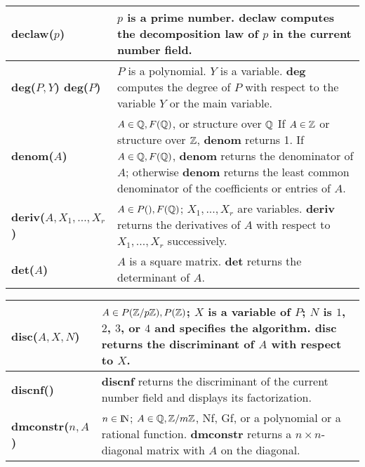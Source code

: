 {\begin{tabular}{|p{1.95in}|p{3.83in}|}
{\bf declaw($p$)} &
$p$ is a prime number.\newline
{\bf declaw} computes the decomposition law of $p$ in the current
number field.\\ \hline

{\bf deg($P, Y$)\newline
deg($P$)} &
$P$ is a polynomial. $Y$ is a variable.\newline
{\bf deg} computes the degree of $P$ with respect to the variable $Y$
or the main variable.\\ \hline

{\bf denom($A$)} &
$A \in \mbox{$\mathbb Q$}, F(\mbox{$\mathbb Q$})$, or structure over $\mbox{$\mathbb Q$}$\newline
If $A \in \mbox{$\mathbb Z$}$ or structure over $\mbox{$\mathbb Z$}$, {\bf denom} returns 1.\newline
If $A \in \mbox{$\mathbb Q$}, F(\mbox{$\mathbb Q$})$, {\bf denom} returns the denominator of $A$;
otherwise {\bf denom} returns the least common denominator of the coefficients
or entries of $A$.\\ \hline

{\bf deriv($A,X_1, \ldots ,X_r$)} &
$A \in P(), F(\mbox{$\mathbb Q$})$; $X_1,...,X_r$ are variables.\newline
{\bf deriv} returns the derivatives of $A$  with respect to\newline
$X_1,..., X_r$ successively.\\ \hline

{\bf det($A$) } &
$A$ is a square matrix.\newline
{\bf det} returns the determinant of $A$.\\ \hline
\end{tabular}

\newpage

\begin{tabular}{|p{1.95in}|p{3.83in}|} \hline

{\bf disc($A,X,N$)} &
$A \in P(\mbox{$\mathbb Z$}/p\mbox{$\mathbb Z$}), P(\mbox{$\mathbb Z$})$; $X$ is a variable of $P$; \newline
$N$ is $1$, $2$, $3$, or $4$ and specifies the algorithm.\newline
{\bf disc} returns the discriminant of $A$ with respect to $X$.\\ \hline

{\bf discnf()} &
{\bf discnf} returns the discriminant of the current number field and
displays its factorization. \\ \hline

{\bf dmconstr($n,A$)} &
$n\in {\rm{I\!N}}$; $A\in \mbox{$\mathbb Q$}, \mbox{$\mathbb Z$}/m\mbox{$\mathbb Z$}$, Nf, Gf, or a polynomial or a rational
function.\newline
{\bf dmconstr} returns a $n\times n$-diagonal matrix with $A$ on the
diagonal.\\ \hline


\end{tabular}}
